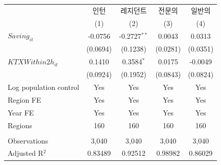 \begingroup
\centering
\begin{tabular}{lcccc}
   \toprule
                          & 인턴     & 레지던트       & 전문의   & 일반의 \\   
                          & (1)      & (2)            & (3)      & (4)\\  
   \midrule 
   $Saving_{it}$          & -0.0756  & -0.2727$^{**}$ & 0.0043   & 0.0313\\   
                          & (0.0694) & (0.1238)       & (0.0281) & (0.0351)\\   
   $KTXWithin2h_{it}$     & 0.1410   & 0.3584$^{*}$   & 0.0175   & -0.0049\\   
                          & (0.0924) & (0.1952)       & (0.0843) & (0.0824)\\   
   Log population control & Yes      & Yes            & Yes      & Yes\\  
   Region FE              & Yes      & Yes            & Yes      & Yes\\  
   Year FE                & Yes      & Yes            & Yes      & Yes\\  
   Regions                & 160      & 160            & 160      & 160\\  
    \\
   Observations           & 3,040    & 3,040          & 3,040    & 3,040\\  
   Adjusted R$^2$         & 0.83489  & 0.92512        & 0.98982  & 0.86029\\  
   \bottomrule
\end{tabular}
\par\endgroup
